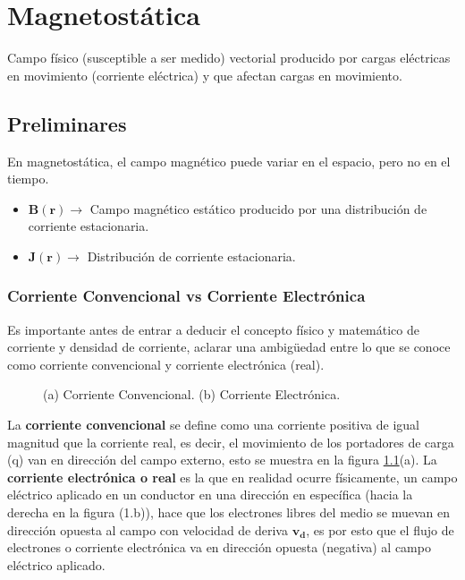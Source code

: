 \documentclass[11pt,fleqn]{book}
\renewcommand{\vec}[1]{\mathbf{#1}}
\begin{document}


\chapter{Magnetostática}

Campo físico (susceptible a ser medido) vectorial producido por cargas eléctricas en movimiento (corriente eléctrica) y que afectan cargas en movimiento.

\section{Preliminares}

En magnetostática, el campo magnético puede variar en el espacio, pero no en el tiempo.

\begin{itemize}
    \item $\vec{B}(\vec{r}) \longrightarrow$ Campo magnético estático producido por una distribución de corriente estacionaria.
    \item $\vec{J}(\vec{r})\longrightarrow$ Distribución de corriente estacionaria.
\end{itemize}{}

\subsection{Corriente Convencional vs Corriente Electrónica}

Es importante antes de entrar a deducir el concepto físico y matemático de corriente y densidad de corriente, aclarar una ambigüedad entre lo que se conoce como corriente convencional y corriente electrónica (real).

\begin{figure}[H]
\centering
{}
\hspace{1cm}
\caption{(a) Corriente Convencional. (b) Corriente Electrónica.}
\label{Fig corriente}
\end{figure}

La \textbf{corriente convencional} se define como una corriente positiva de igual magnitud que la corriente real, es decir, el movimiento de los portadores de carga (q) van en dirección del campo externo, esto se muestra en la figura \ref{Fig corriente}(a). La \textbf{corriente electrónica o real} es la que en realidad ocurre físicamente, un campo eléctrico aplicado en un conductor en una dirección en específica (hacia la derecha en la figura (1.b)), hace que los electrones libres del medio se muevan en dirección opuesta al campo con velocidad de deriva $\vec{v_{d}}$, es por esto que el flujo de electrones o corriente electrónica va en dirección opuesta (negativa) al campo eléctrico aplicado.
\end{document}
